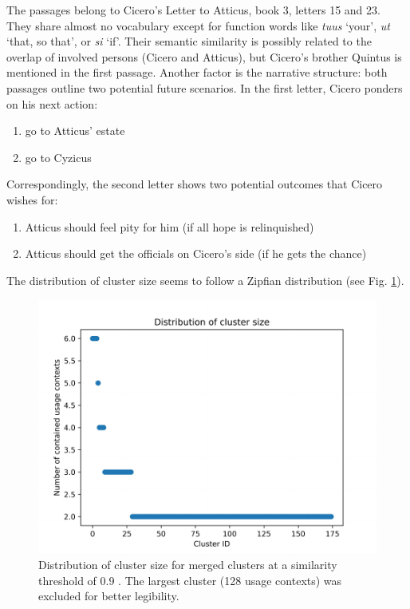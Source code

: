 \documentclass[oneside]{book}
\begin{document}
The passages belong to Cicero's Letter to Atticus, book 3, letters 15 and 23. They share almost no vocabulary except for function words like \textit{tuus} `your', \textit{ut} `that, so that', or \textit{si} `if'. Their semantic similarity is possibly related to the overlap of involved persons (Cicero and Atticus), but Cicero's brother Quintus is mentioned in the first passage. Another factor is the narrative structure: both passages outline two potential future scenarios. In the first letter, Cicero ponders on his next action:
\begin{enumerate}[label=(\alph*)]
	\item go to Atticus' estate
	\item go to Cyzicus
\end{enumerate}
Correspondingly, the second letter shows two potential outcomes that Cicero wishes for:
\begin{enumerate}[label=(\alph*)]
	\item Atticus should feel pity for him (if all hope is relinquished)
	\item Atticus should get the officials on Cicero's side (if he gets the chance)
\end{enumerate}



The distribution of cluster size seems to follow a Zipfian distribution (see Fig. \ref{figure:cluster_size_distribution}). 

\begin{figure}[ht]
	\includegraphics[width=\linewidth]{cluster_size_distribution.pdf}
	\caption{Distribution of cluster size for merged clusters at a similarity threshold of 0.9 . The largest cluster (128 usage contexts) was excluded for better legibility.}
	\label{figure:cluster_size_distribution}
\end{figure}
\end{document}
